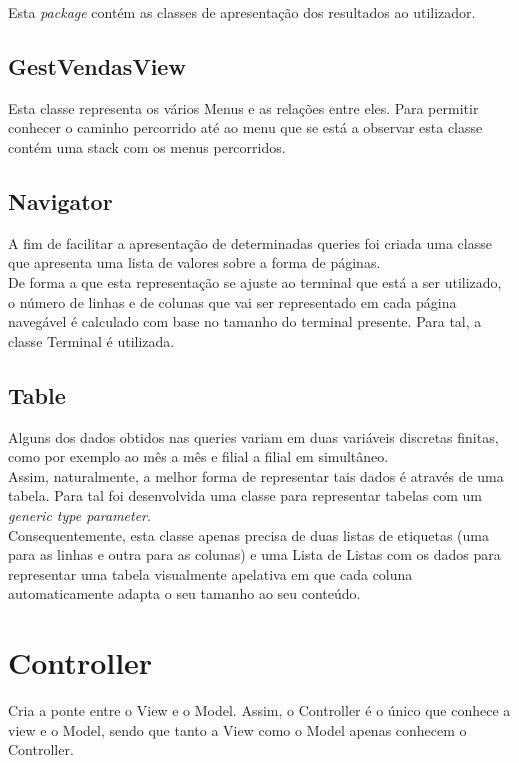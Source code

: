 \documentclass[a4paper]{report}
\begin{document}
Esta \textit{package} contém as classes de apresentação dos resultados ao utilizador.

\subsection{GestVendasView}

Esta classe representa os vários Menus e as relações entre eles. Para permitir
conhecer o caminho percorrido até ao menu que se está a observar esta classe
contém uma stack com os menus percorridos.

\subsection{Navigator}

A fim de facilitar a apresentação de determinadas queries foi criada uma classe que apresenta uma
lista de valores sobre a forma de páginas.\\
De forma a que esta representação se ajuste ao terminal que está a ser utilizado, o número de linhas
e de colunas que vai ser representado em cada página navegável é calculado com base no tamanho do
terminal presente. Para tal, a classe Terminal é utilizada.

\subsection{Table}

Alguns dos dados obtidos nas queries variam em duas variáveis discretas finitas, como por exemplo
ao mês a mês e filial a filial em simultâneo.\\
Assim, naturalmente, a melhor forma de representar tais dados é através de uma tabela.
Para tal foi desenvolvida uma classe para representar tabelas com um \textit{generic type parameter}.\\
Consequentemente, esta classe apenas precisa de duas listas de etiquetas (uma para as linhas e
outra para as colunas) e uma Lista de Listas com os dados para representar uma tabela visualmente
apelativa em que cada coluna automaticamente adapta o seu tamanho ao seu conteúdo.

\section{Controller}

Cria a ponte entre o View e o Model. Assim, o Controller é o único que conhece a view e o
Model, sendo que tanto a View como o Model apenas conhecem o Controller.
\end{document}
